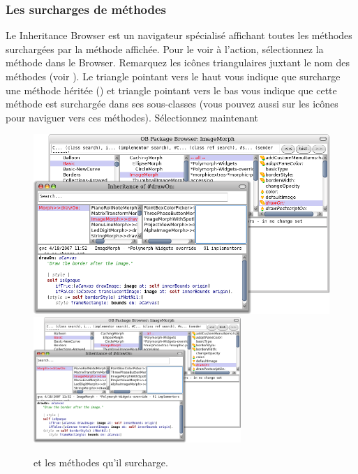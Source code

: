 \documentclass[a4paper,10pt,twoside]{book}
\begin{document}
\subsubsection{Les surcharges de méthodes}

Le Inheritance Browser est un navigateur spécialisé
affichant toutes les méthodes surchargées par la méthode affichée.
Pour le voir à l'action, sélectionnez la méthode
 dans le Browser.
Remarquez les icônes triangulaires juxtant le nom des méthodes (voir ).
Le triangle pointant vers le haut vous indique que 
 surcharge une méthode héritée
 (\ie {}) et triangle pointant vers le bas vous
 indique que cette méthode est surchargée dans ses sous-classes (vous
 pouvez aussi \click sur les icônes pour naviguer vers ces méthodes).
Sélectionnez maintenant 

\begin{figure}[tbp]
	\begin{center}
   \ifluluelse
		{\includegraphics[width=\textwidth]{OBInheritanceOverriding}}
		{\includegraphics[width=0.7\textwidth]{OBInheritanceOverriding}}
	\end{center}
	\caption{ et les méthodes qu'il
      surcharge. } %
\end{figure}
\end{document}
